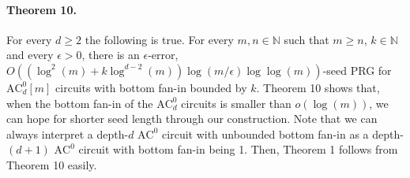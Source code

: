 \documentclass[10pt,a4paper]{article}
\begin{document}
\paragraph{Theorem 10.} For every $d\ge2$ the following is true. For every $m,n\in\mathbb N$ such that $m\ge n$, $k\in\mathbb N$ and every $\epsilon>0$, there is an $\epsilon$-error, $O((\log^2(m)+k\log^{d-2}(m))\log(m/\epsilon)\log\log(m))$-seed PRG for $\mathrm{AC}^0_d[m]$ circuits with bottom fan-in bounded by $k$.
Theorem 10 shows that, when the bottom fan-in of the $\mathrm{AC}^0_d$ circuits is smaller than $o(\log(m))$, we can hope for shorter seed length through our construction. Note that we can always interpret a depth-$d$ $\mathrm{AC}^0$ circuit with unbounded bottom fan-in as a depth-$(d+1)$ $\mathrm{AC}^0$ circuit with bottom fan-in being 1. Then, Theorem 1 follows from Theorem 10 easily.
\end{document}

